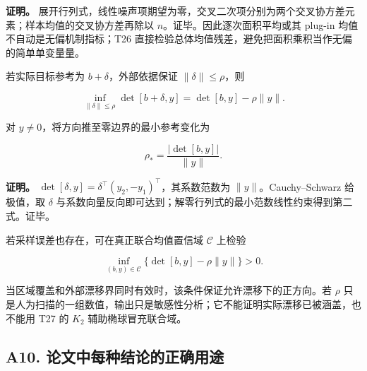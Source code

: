 \documentclass[11pt,a4paper]{article}
\begin{document}
\textbf{证明。}
展开行列式，线性噪声项期望为零，交叉二次项分别为两个交叉协方差元素；样本均值的交叉协方差再除以
\(n\)。证毕。因此逐次面积平均或其 plug-in 均值不自动是无偏机制指标；T26
直接检验总体均值残差，避免把面积乘积当作无偏的简单单变量量。

\par
\noindent\begin{minipage}{\linewidth}

若实际目标参考为 \(b+\delta\)，外部依据保证 \(\|\delta\|\le\rho\)，则

\[
\inf_{\|\delta\|\le\rho}\det[b+\delta,y]
=\det[b,y]-\rho\|y\|.
\]

\end{minipage}\par

\par
\noindent\begin{minipage}{\linewidth}

对 \(y\ne0\)，将方向推至零边界的最小参考变化为

\[
\rho_*=\frac{|\det[b,y]|}{\|y\|}.
\]

\end{minipage}\par

\textbf{证明。}
\(\det[\delta,y]=\delta^\top(y_2,-y_1)^\top\)，其系数范数为
\(\|y\|\)。Cauchy–Schwarz 给极值，取 \(\delta\)
与系数向量反向即可达到；解零行列式的最小范数线性约束得到第二式。证毕。

\par
\noindent\begin{minipage}{\linewidth}

若采样误差也存在，可在真正联合均值置信域 \(\mathcal C\) 上检验

\[
\inf_{(b,y)\in\mathcal C}
\{\det[b,y]-\rho\|y\|\}>0.
\]

\end{minipage}\par

当区域覆盖和外部漂移界同时有效时，该条件保证允许漂移下的正方向。若
\(\rho\)
只是人为扫描的一组数值，输出只是敏感性分析；它不能证明实际漂移已被涵盖，也不能用
T27 的 \(K_2\) 辅助椭球冒充联合域。

\subsection{A10.
论文中每种结论的正确用途}\label{a10.-ux8bbaux6587ux4e2dux6bcfux79cdux7ed3ux8bbaux7684ux6b63ux786eux7528ux9014}
\end{document}
